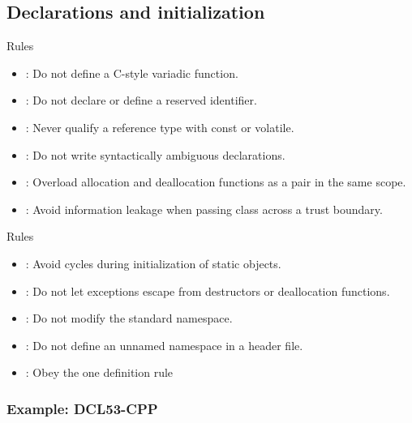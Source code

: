\subsection{Declarations and initialization}

\begin{frame}[t]{Rules}
\begin{itemize}
  \item {}: Do not define a C-style variadic function.
  \vfill
  \item {}: Do not declare or define a reserved identifier.
  \vfill
  \item {}: Never qualify a reference type with const or volatile.
  \vfill
  \item {}: Do not write syntactically ambiguous declarations.
  \vfill
  \item {}: Overload allocation and deallocation functions as a pair in the same scope.
  \vfill
  \item {}: Avoid information leakage when passing class across a trust boundary.
\end{itemize}
\end{frame}


\begin{frame}[t]{Rules}
\begin{itemize}
  \item {}: Avoid cycles during initialization of static objects.
  \vfill
  \item {}: Do not let exceptions escape from destructors or deallocation functions.
  \vfill
  \item {}: Do not modify the standard namespace.
  \vfill
  \item {}: Do not define an unnamed namespace in a header file.
  \vfill
  \item {}: Obey the one definition rule
\end{itemize}
\end{frame}

\subsubsection{Example: DCL53-CPP}

